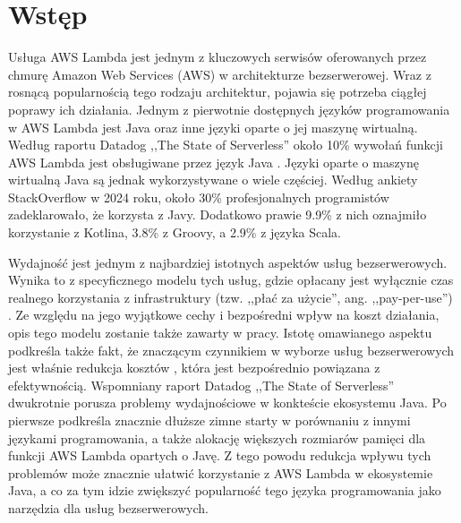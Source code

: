 \chapter*{Wstęp}\label{chapter:wstep}

Usługa AWS Lambda jest jednym z kluczowych serwisów oferowanych przez chmurę Amazon Web Services (AWS) w architekturze bezserwerowej. 
Wraz z rosnącą popularnością tego rodzaju architektur, pojawia się potrzeba ciągłej poprawy ich działania. 
Jednym z pierwotnie dostępnych języków programowania w AWS Lambda jest Java oraz inne języki oparte o jej maszynę wirtualną.
Według raportu Datadog ,,The State of Serverless'' około 10\% wywołań funkcji AWS Lambda jest obsługiwane przez język Java \cite{datadog_state_of_serverless}.
Języki oparte o maszynę wirtualną Java są jednak wykorzystywane o wiele częściej.
Według ankiety StackOverflow w 2024 roku, około 30\% profesjonalnych programistów zadeklarowało, że korzysta z Javy.
Dodatkowo prawie 9.9\% z nich oznajmiło korzystanie z Kotlina, 3.8\% z Groovy, a 2.9\% z języka Scala. 

Wydajność jest jednym z najbardziej istotnych aspektów usług bezserwerowych.
Wynika to z specyficznego modelu tych usług, gdzie opłacany jest wyłącznie czas realnego korzystania z infrastruktury (tzw. ,,płać za użycie'', ang. ,,pay-per-use'') \cite{ServerlessApplicationsWhyWhenAndHow}.
Ze względu na jego wyjątkowe cechy i bezpośredni wpływ na koszt działania, opis tego modelu zostanie także zawarty w pracy.
Istotę omawianego aspektu podkreśla także fakt, że znaczącym czynnikiem w wyborze usług bezserwerowych jest właśnie redukcja kosztów \cite{ServerlessApplicationsWhyWhenAndHow}, która jest bezpośrednio powiązana z efektywnością.
Wspomniany raport Datadog ,,The State of Serverless'' \cite{datadog_state_of_serverless} dwukrotnie porusza problemy wydajnościowe w konkteście ekosystemu Java.
Po pierwsze podkreśla znacznie dłuższe zimne starty w porównaniu z innymi językami programowania, a także alokację większych rozmiarów pamięci dla funkcji AWS Lambda opartych o Javę.
Z tego powodu redukcja wpływu tych problemów może znacznie ułatwić korzystanie z AWS Lambda w ekosystemie Java, a co za tym idzie zwiększyć popularność tego języka programowania jako narzędzia dla usług bezserwerowych.

